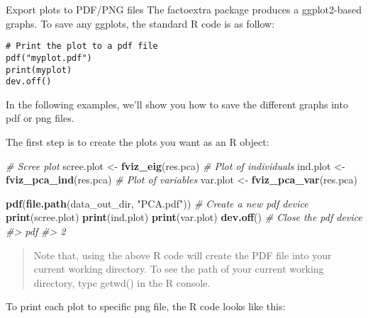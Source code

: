\documentclass[]{book}
\newenvironment{Shaded}{\begin{snugshade}}{\end{snugshade}}
\newcommand{\CommentTok}[1]{\textcolor[rgb]{0.56,0.35,0.01}{\textit{#1}}}
\newcommand{\KeywordTok}[1]{\textcolor[rgb]{0.13,0.29,0.53}{\textbf{#1}}}
\newcommand{\NormalTok}[1]{#1}
\newcommand{\StringTok}[1]{\textcolor[rgb]{0.31,0.60,0.02}{#1}}
\begin{document}
Export plots to PDF/PNG files
The factoextra package produces a ggplot2-based graphs. To save any ggplots, the standard R code is as follow:

\begin{verbatim}
# Print the plot to a pdf file
pdf("myplot.pdf")
print(myplot)
dev.off()
\end{verbatim}

In the following examples, we'll show you how to save the different graphs into pdf or png files.

The first step is to create the plots you want as an R object:

\begin{Shaded}
\begin{Highlighting}[]
\CommentTok{# Scree plot}
\NormalTok{scree.plot <-}\StringTok{ }\KeywordTok{fviz_eig}\NormalTok{(res.pca)}
\CommentTok{# Plot of individuals}
\NormalTok{ind.plot <-}\StringTok{ }\KeywordTok{fviz_pca_ind}\NormalTok{(res.pca)}
\CommentTok{# Plot of variables}
\NormalTok{var.plot <-}\StringTok{ }\KeywordTok{fviz_pca_var}\NormalTok{(res.pca)}
\end{Highlighting}
\end{Shaded}

\begin{Shaded}
\begin{Highlighting}[]
\KeywordTok{pdf}\NormalTok{(}\KeywordTok{file.path}\NormalTok{(data_out_dir, }\StringTok{"PCA.pdf"}\NormalTok{))   }\CommentTok{# Create a new pdf device}
\KeywordTok{print}\NormalTok{(scree.plot)}
\KeywordTok{print}\NormalTok{(ind.plot)}
\KeywordTok{print}\NormalTok{(var.plot)}
\KeywordTok{dev.off}\NormalTok{() }\CommentTok{# Close the pdf device}
\CommentTok{#> pdf }
\CommentTok{#>   2}
\end{Highlighting}
\end{Shaded}

\begin{quote}
Note that, using the above R code will create the PDF file into your current working directory. To see the path of your current working directory, type getwd() in the R console.
\end{quote}

To print each plot to specific png file, the R code looks like this:
\end{document}
